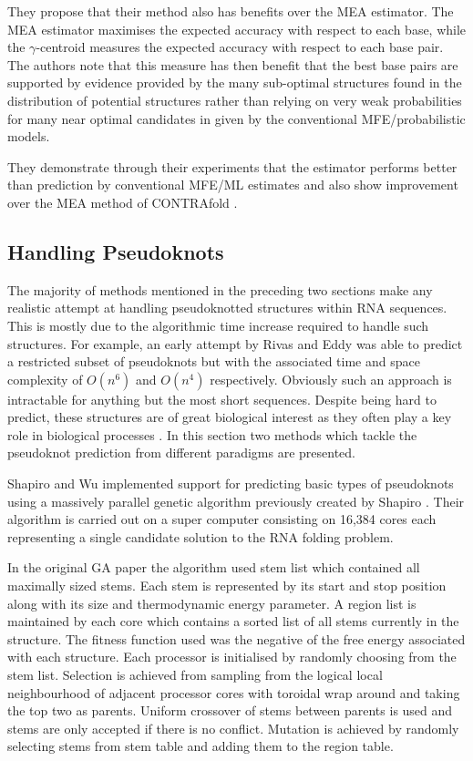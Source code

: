 \documentclass[journal]{IEEEtran}
\begin{document}
They propose that their method also has benefits over the MEA estimator. The MEA estimator maximises the expected accuracy with respect to each base, while the $\gamma$-centroid measures the expected accuracy with respect to each base pair. The authors note that this measure has then benefit that the best base pairs are supported by evidence provided by the many sub-optimal structures found in the distribution of potential structures rather than relying on very weak probabilities for many near optimal candidates in given by the conventional MFE/probabilistic models. 

They demonstrate through their experiments that the estimator performs better than prediction by conventional MFE/ML estimates and also show improvement over the MEA method of CONTRAfold \cite{do2006contrafold}.


\subsection{Handling Pseudoknots}
\label{subsec:secondary-pseudoknots}
The majority of methods mentioned in the preceding two sections make any realistic attempt at handling pseudoknotted structures within RNA sequences. This is mostly due to the algorithmic time increase required to handle such structures. For example, an early attempt by Rivas and Eddy \cite{rivas1999dynamic} was able to predict a restricted subset of pseudoknots but with the associated time and space complexity of $O(n^6)$ and $O(n^4)$ respectively. Obviously such an approach is intractable for anything but the most short sequences. Despite being hard to predict, these structures are of great biological interest as they often play a key role in biological processes \cite{chen2005functional, pleij1985new}. In this section two methods which tackle the pseudoknot prediction from different paradigms are presented.

Shapiro and Wu \cite{shapiro1997predicting} implemented support for predicting basic types of pseudoknots using a massively parallel genetic algorithm previously created by Shapiro \cite{shapiro1994massively}. Their algorithm is carried out on a super computer consisting on 16,384 cores each representing a single candidate solution to the RNA folding problem.

In the original GA paper \cite{shapiro1994massively} the algorithm used stem list which contained all maximally sized stems. Each stem is represented by its start and stop position along with its size and thermodynamic energy parameter. A region list is maintained by each core which contains a sorted list of all stems currently in the structure. The fitness function used was the negative of the free energy associated with each structure. Each processor is initialised by randomly choosing from the stem list. Selection is achieved from sampling from the logical local neighbourhood of adjacent processor cores with toroidal wrap around and taking the top two as parents. Uniform crossover of stems between parents is used and stems are only accepted if there is no conflict. Mutation is achieved by randomly selecting stems from stem table and adding them to the region table.
\end{document}
